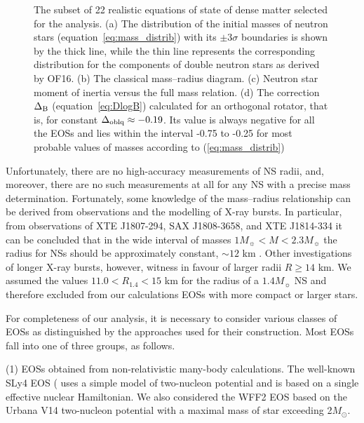 \documentclass[fleqn,usenatbib]{mnras}
\begin{document}
\begin{figure}
    {\centering {} \par}
    \caption{The subset of 22 realistic equations of state of dense matter
selected for the analysis. (a) The distribution of the initial masses of neutron
stars (equation~\ref{eq:mass_distrib}) with its $\pm 3\sigma$ boundaries is shown by the thick line, while
the thin line represents the corresponding distribution for the components
of double neutron stars as derived by OF16. (b) The classical mass--radius
diagram. (c) Neutron star moment of inertia versus the full mass relation.
(d) The correction $\Delta_{\rm B}$ (equation~\ref{eq:DlogB}) calculated for an orthogonal rotator, that
is, for constant $\Delta_{\rm oblq} \approx
-0.19$. Its value is always negative for all the EOSs
and lies within the interval -0.75 to -0.25 for most probable values of
masses according to (\ref{eq:mass_distrib})}
    \label{fig:eos_list}
\end{figure}

Unfortunately, there are no high-accuracy measurements of NS
radii, and, moreover, there are no such measurements at all for any
NS with a precise mass determination. Fortunately, some knowledge of the mass--radius relationship can be derived from observations and the modelling of X-ray bursts. In particular, from observations of XTE
J1807-294, SAX J1808-3658, and XTE J1814-334 it can be concluded that in the wide interval of masses
$1M_{\sun} < M < 2.3M_{\sun}$ the radius for NSs should be approximately
constant, $\sim 12 $ km \citep{Leahy}. Other investigations \citep{SLM, HAMB} of longer
X-ray bursts, however, witness in favour of larger radii $R\geq 14$ km.
We assumed the values $11.0<
R_{1.4}<15$ km for the radius of a
$1.4M_{\sun}$ NS and therefore excluded from our calculations EOSs
with more compact or larger stars.


For completeness of our analysis, it is necessary to consider
various classes of EOSs as distinguished by the approaches used
for their construction. Most EOSs fall into one of three groups, as
follows.

(1) EOSs obtained from non-relativistic many-body calculations.
The well-known SLy4 EOS (\citep{SLy, SLy-4} uses a simple model of two-nucleon potential and is
based on a single effective nuclear Hamiltonian. We also considered
the WFF2 EOS based on the Urbana V14 two-nucleon potential
\citep{WFF} with a maximal mass of star
exceeding 2$M_\odot$.
\end{document}
